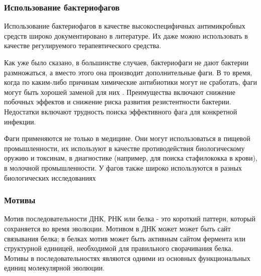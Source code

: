 \documentclass[14pt]{extarticle}
\begin{document}
    \begin{center}
    \item \subsubsection{Использование бактериофагов}
    \end{center}
    
    \par{Использование бактериофагов в качестве высокоспецифичных антимикробных средств широко документировано в 
    литературе. Их даже можно использовать в качестве регулируемого терапевтического средства.}
    
    \par{Как уже было сказано, в большинстве случаев, бактериофаги не дают бактерии размножаться, а вместо этого она 
    производит дополнительные фаги. В то время, когда по каким-либо причинам химические антибиотики 
    могут не сработать, фаги могут быть хорошей заменой для них \cite{phageapps}. Преимущества включают снижение 
    побочных эффектов и снижение риска развития резистентности бактерии. Недостатки включают трудность поиска 
    эффективного фага для конкретной инфекции. \cite{advdisphage}}
    
    \par{Фаги применяются не только в медицине. Они могут использоваться в пищевой промышленности, их 
    используют в качестве противодействия биологическому оружию и токсинам, в диагностике (например, для поиска 
    стафилококка в крови), в молочной промышленности. У фагов также широко используются в разных биологических 
    исследованиях \cite{phagewikieng}}
    
    \begin{center}
    \item \subsubsection{Мотивы}
    \end{center}
    
    \par{Мотив последовательности ДНК, РНК или белка - это короткий паттерн, который сохраняется во время эволюции. 
    Мотивом в ДНК может может быть сайт связывания белка; в белках мотив может быть активным сайтом фермента или 
    структурной единицей, необходимой для правильного сворачивания белка. Мотивы в последовательностях являются одними 
    из основных функциональных единиц молекулярной эволюции.}
    
\end{document}

